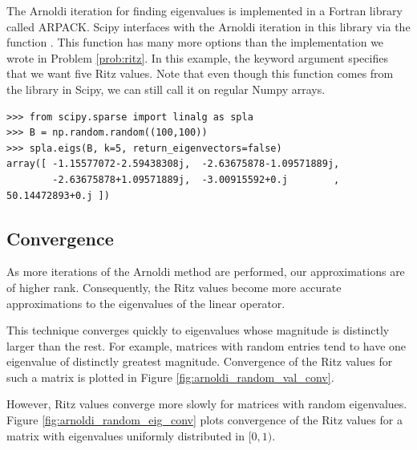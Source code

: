 The Arnoldi iteration for finding eigenvalues is implemented in a Fortran library called ARPACK.
Scipy interfaces with the Arnoldi iteration in this library via the function .
This function has many more options than the implementation we wrote in Problem \ref{prob:ritz}.
In this example, the keyword argument  specifies that we want five Ritz values.
Note that even though this function comes from the  library in Scipy, we can still call it on regular Numpy arrays.

\begin{lstlisting}
>>> from scipy.sparse import linalg as spla
>>> B = np.random.random((100,100))
>>> spla.eigs(B, k=5, return_eigenvectors=false)
array([ -1.15577072-2.59438308j,  -2.63675878-1.09571889j,
        -2.63675878+1.09571889j,  -3.00915592+0.j        ,  50.14472893+0.j ])
\end{lstlisting}

\subsection*{Convergence} %
As more iterations of the Arnoldi method are performed, our approximations are of higher rank.
Consequently, the Ritz values become more accurate approximations to the eigenvalues of the linear operator.

This technique converges quickly to eigenvalues whose magnitude is distinctly larger than the rest.
For example, matrices with random entries tend to have one eigenvalue of distinctly greatest magnitude.
Convergence of the Ritz values for such a matrix is plotted in Figure \ref{fig:arnoldi_random_val_conv}.

However, Ritz values converge more slowly for matrices with random eigenvalues.
Figure \ref{fig:arnoldi_random_eig_conv} plots convergence of the Ritz values for a matrix with eigenvalues uniformly distributed in $[0,1)$.

